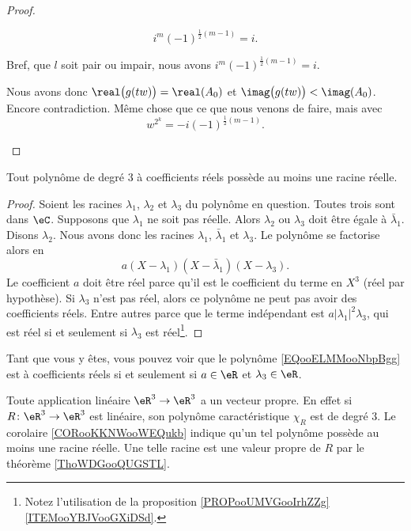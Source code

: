 \begin{proof}
\begin{subproof}
\begin{subproof}
\begin{subproof}
				\begin{equation}
					i^m(-1)^{\frac{ 1 }{2}(m-1)}=i.
				\end{equation}
			\end{subproof}
			Bref, que \( l\) soit pair ou impair, nous avons \( i^m(-1)^{\frac{ 1 }{2}(m-1)}=i\).
		\end{subproof}
		Nous avons donc \( \real\big( g(tw) \big)=\real(A_0)\) et \( \imag\big( g(tw) \big)<\imag(A_0)\). Encore contradiction.
		\spitem[Si \( \imag(A_0)>0\)]
		Même chose que ce que nous venons de faire, mais avec
		\begin{equation}
			w^{2^k}=-i(-1)^{\frac{ 1 }{2}(m-1)}.
		\end{equation}
	\end{subproof}
\end{proof}


\begin{corollary}       \label{CORooKKNWooWEQukb}
	Tout polynôme de degré \( 3\) à coefficients réels possède au moins une racine réelle.
\end{corollary}

\begin{proof}
	Soient les racines \( \lambda_1\), \( \lambda_2\) et \( \lambda_3\) du polynôme en question. Toutes trois sont dans \( \eC\). Supposons que \( \lambda_1\) ne soit pas réelle. Alors \( \lambda_2\) ou \( \lambda_3\) doit être égale à \( \bar\lambda_1\). Disons \( \lambda_2\). Nous avons donc les racines \( \lambda_1\), \( \bar\lambda_1\) et \( \lambda_3\). Le polynôme se factorise alors en
	\begin{equation}        \label{EQooELMMooNbpBgg}
		a(X-\lambda_1)(X-\bar\lambda_1)(X-\lambda_3).
	\end{equation}
	Le coefficient \( a\) doit être réel parce qu'il est le coefficient du terme en \( X^3\) (réel par hypothèse). Si \( \lambda_3\) n'est pas réel, alors ce polynôme ne peut pas avoir des coefficients réels. Entre autres parce que le terme indépendant est \( a| \lambda_1 |^2\lambda_3\), qui est réel si et seulement si \( \lambda_3\) est réel\footnote{Notez l'utilisation de la proposition \ref{PROPooUMVGooIrhZZg}\ref{ITEMooYBJVooGXiDSd}.}.
\end{proof}
Tant que vous y êtes, vous pouvez voir que le polynôme \eqref{EQooELMMooNbpBgg} est à coefficients réels si et seulement si \( a\in \eR\) et \( \lambda_3\in \eR\).

\begin{example}     \label{EXooIPLOooSNfiWg}
	Toute application linéaire \( \eR^3\to \eR^3\) a un vecteur propre. En effet si \( R\colon \eR^3\to \eR^3\) est linéaire, son polynôme caractéristique \( \chi_R\) est de degré \( 3\). Le corolaire \ref{CORooKKNWooWEQukb} indique qu'un tel polynôme possède au moins une racine réelle.
	Une telle racine est une valeur propre de \( R\) par le théorème \ref{ThoWDGooQUGSTL}.
\end{example}

